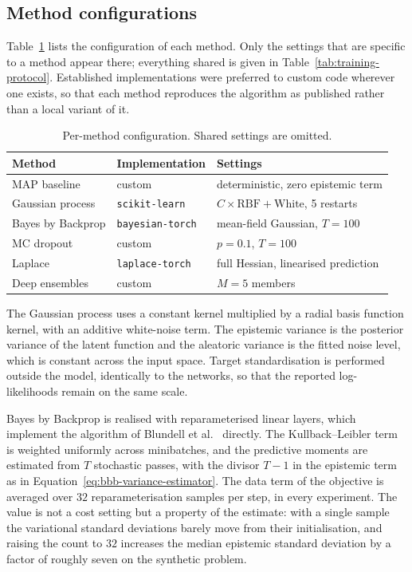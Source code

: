 \subsection{Method configurations}
\label{subsec:method-configurations}

Table~\ref{tab:method-config} lists the configuration of each method. Only the
settings that are specific to a method appear there; everything shared is given in
Table~\ref{tab:training-protocol}. Established implementations were preferred to
custom code wherever one exists, so that each method reproduces the algorithm as
published rather than a local variant of it.

\begin{table}[htbp]
    \centering
    \caption{Per-method configuration. Shared settings are omitted.}
    \label{tab:method-config}
    \begin{tabular}{lll}
        \hline
        Method & Implementation & Settings \\
        \hline
        MAP baseline       & custom            & deterministic, zero epistemic term \\
        Gaussian process   & \texttt{scikit-learn} & $C \times \mathrm{RBF} + \mathrm{White}$, 5 restarts \\
        Bayes by Backprop  & \texttt{bayesian-torch} & mean-field Gaussian, $T = 100$ \\
        MC dropout         & custom            & $p = 0.1$, $T = 100$ \\
        Laplace            & \texttt{laplace-torch}  & full Hessian, linearised prediction \\
        Deep ensembles     & custom            & $M = 5$ members \\
        \hline
    \end{tabular}
\end{table}

The Gaussian process uses a constant kernel multiplied by a radial basis function
kernel, with an additive white-noise term. The epistemic variance is the posterior
variance of the latent function and the aleatoric variance is the fitted noise level,
which is constant across the input space. Target standardisation is performed outside
the model, identically to the networks, so that the reported log-likelihoods remain on
the same scale.

Bayes by Backprop is realised with reparameterised linear layers, which implement the
algorithm of Blundell et al.~\cite{blundell2015} directly. The Kullback--Leibler term
is weighted uniformly across minibatches, and the predictive moments are estimated from
$T$ stochastic passes, with the divisor $T - 1$ in the epistemic term as in
Equation~\eqref{eq:bbb-variance-estimator}. The data term of the objective is averaged
over $32$ reparameterisation samples per step, in every experiment. The value is not a
cost setting but a property of the estimate: with a single sample the variational
standard deviations barely move from their initialisation, and raising the count to $32$
increases the median epistemic standard deviation by a factor of roughly seven on the
synthetic problem.

